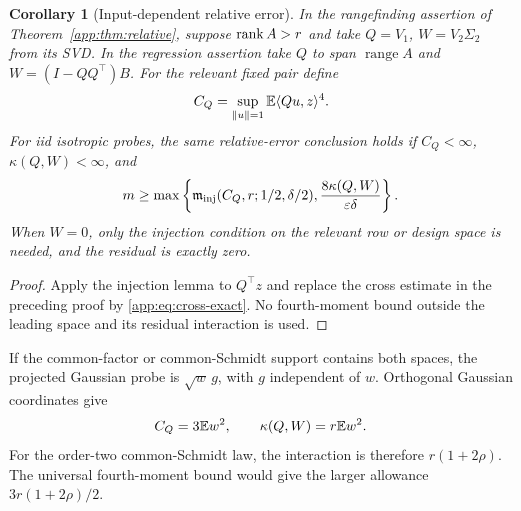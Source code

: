 \documentclass[11pt,a4paper]{article}
\newtheorem{corollary}[theorem]{Corollary}
\theoremstyle{definition}\newtheorem{definition}[theorem]{Definition}
\theoremstyle{remark}\newtheorem{remark}[theorem]{Remark}
\numberwithin{equation}{section}
\newcommand{\norm}[1]{\lVert#1\rVert}\newcommand{\ip}[2]{\langle#1,#2\rangle}
\DeclareMathOperator{\range}{range}\DeclareMathOperator{\diag}{diag}
\begin{document}
\begin{corollary}[Input-dependent relative error]\label{app:cor:input}
In the rangefinding assertion of Theorem~\ref{app:thm:relative}, suppose
$\operatorname{rank} A>r$ and take $Q=V_1$, $W=V_2\Sigma_2$ from its SVD. In the
regression assertion take $Q$ to span $\range A$ and
$W=(I-QQ^\top)B$. For the relevant fixed pair define
\[
 C_Q=\sup_{\norm u=1}\E\ip{Qu}{z}^4.
\]
For iid isotropic probes, the same relative-error conclusion holds if
$C_Q<\infty$, $\kappa(Q,W)<\infty$, and
\begin{equation}\label{app:eq:input-budget}
 m\ge\max\left\{\mathfrak m_{\rm inj}(C_Q,r;1/2,\delta/2),
                  \frac{8\kappa(Q,W)}{\varepsilon\delta}\right\}.
\end{equation}
When $W=0$, only the injection condition on the relevant row or design
space is needed, and the residual is exactly zero.
\end{corollary}
\begin{proof}
Apply the injection lemma to $Q^\top z$ and replace the cross estimate
in the preceding proof by \eqref{app:eq:cross-exact}. No fourth-moment
bound outside the leading space and its residual interaction is used.
\end{proof}

If the common-factor or common-Schmidt support contains both spaces,
the projected Gaussian probe is $\sqrt w\,g$, with $g$ independent of $w$.
Orthogonal Gaussian coordinates give
\[
 C_Q=3\mathbb E w^2,\qquad \kappa(Q,W)=r\mathbb E w^2.
\]
For the order-two common-Schmidt law, the interaction is therefore
$r(1+2\rho)$. The universal fourth-moment bound would give the larger
allowance $3r(1+2\rho)/2$.
\end{document}
